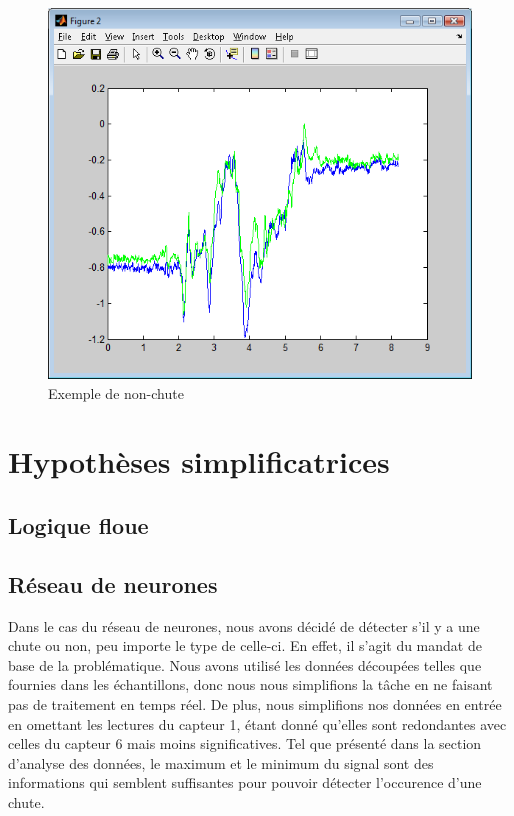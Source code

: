 \documentclass[12pt,letterpaper]{article}
\begin{document}
\begin{figure}
\centering
\includegraphics[scale=0.5]{images/non_chute.png}
\caption{Exemple de non-chute}
\label{fig:non_chute}
\end{figure}

\section{Hypothèses simplificatrices}

\subsection{Logique floue}

\subsection{Réseau de neurones} %
Dans le cas du réseau de neurones, nous avons décidé de détecter s'il y a une chute ou non, peu importe le type de celle-ci. En effet, il s'agit du mandat de base de la problématique. Nous avons utilisé les données découpées telles que fournies dans les échantillons, donc nous nous simplifions la tâche en ne faisant pas de traitement en temps réel. De plus, nous simplifions nos données en entrée en omettant les lectures du capteur 1, étant donné qu'elles sont redondantes avec celles du capteur 6 mais moins significatives. Tel que présenté dans la section d'analyse des données, le maximum et le minimum du signal sont des informations qui semblent suffisantes pour pouvoir détecter l'occurence d'une chute.
\end{document}
